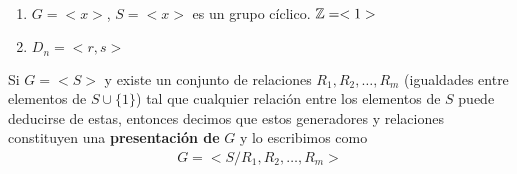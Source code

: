 \begin{ejemplo}\
    \begin{enumerate}
        \item $G=<x>$, $S=<x>$ es un grupo cíclico. $\mathbb{Z}=<1>$
        \item $D_n=<r,s>$
    \end{enumerate}
\end{ejemplo}

\begin{definicion}
    Si $G=<S>$ y existe un conjunto de relaciones $R_1,R_2,\dots,R_m$ (igualdades entre elementos de $S\cup\{1\}$) tal que cualquier relación entre los elementos de $S$ puede deducirse de estas, entonces decimos que estos generadores y relaciones constituyen una \textbf{presentación de} $G$ y lo escribimos como
    \begin{align*}
        G=<S /R_1,R_2,\dots,R_m>
    \end{align*}
\end{definicion}

